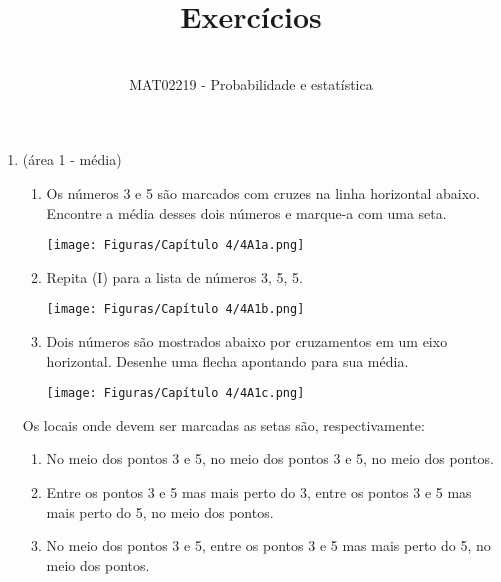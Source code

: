 \documentclass[12pt]{article}\documentclass[brazilian,12pt,a4paper,final]{article}
\begin{document}
 
 
\title{Exercícios}%
\author{\\ %
MAT02219 - Probabilidade e estatística} %
 
\maketitle
 \begin{enumerate} 

\section*{CAPÍTULO 4 media mediana desvio padrão}

\section{CAPÍTULO 4}

 \item (área 1 - média) \begin{enumerate}[label=(\Roman*)] \item Os números 3 e 5 são marcados com cruzes na linha horizontal abaixo. Encontre
a média desses dois números e marque-a com uma seta.

\texttt{[image: Figuras/Capítulo 4/4A1a.png]}
\item Repita (I) para a lista de números 3, 5, 5.

\texttt{[image: Figuras/Capítulo 4/4A1b.png]}
\item Dois números são mostrados abaixo por cruzamentos em um eixo horizontal. Desenhe uma flecha
apontando para sua média.

\texttt{[image: Figuras/Capítulo 4/4A1c.png]}
\end{enumerate}
Os locais onde devem ser marcadas as setas são, respectivamente:
\begin{enumerate}[label=(\alph*)]
\item No meio dos pontos 3 e 5, no meio dos pontos 3 e 5, no meio dos pontos. 

\item Entre os pontos 3 e 5 mas mais perto do 3, entre os pontos 3 e 5 mas mais perto do 5, no meio dos pontos.

\item No meio dos pontos 3 e 5, entre os pontos 3 e 5 mas mais perto do 5, no meio dos pontos.


\end{enumerate}
\end{enumerate}
\end{document}
